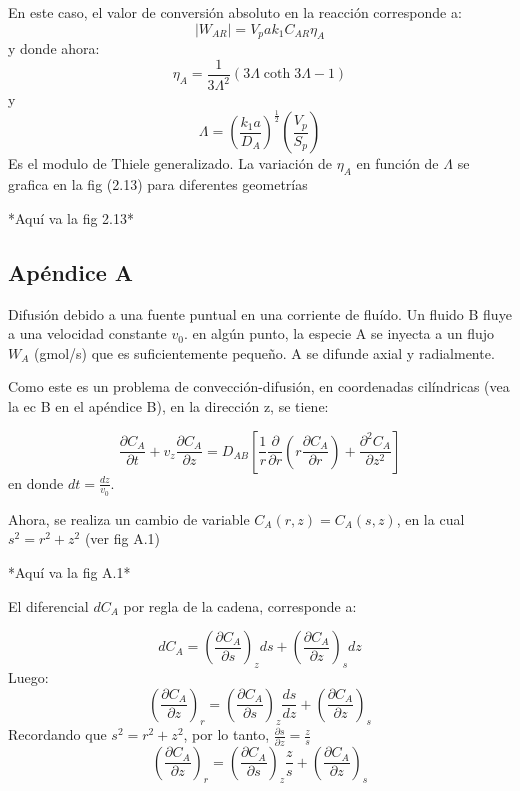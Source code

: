 En este caso, el valor de conversión absoluto en la reacción corresponde a:
\begin{equation*}
    |W_{AR}|=V_pak_1C_{AR}\eta_A
\end{equation*}
y donde ahora:
\begin{equation}
    \eta_A=\frac{1}{3\Lambda^2}(3\Lambda \coth 3\Lambda-1)
\end{equation} 
y
\begin{equation}
    \Lambda=(\frac{k_1a}{D_A})^{\frac{1}{2}}(\frac{V_p}{S_p})
\end{equation}
Es el modulo de Thiele generalizado. La variación de $\eta_A$ en función de $\Lambda$ se grafica en la fig (2.13) para diferentes geometrías

*Aquí va la fig 2.13*

\subsection{Apéndice A}
Difusión debido a una fuente puntual en una corriente de fluído.
Un fluido B fluye a una velocidad constante $v_0$. en algún punto, la especie A se inyecta a un flujo $W_A$ (gmol/s) que es suficientemente pequeño. A se difunde axial y radialmente.

Como este es un problema de convección-difusión, en coordenadas cilíndricas (vea la ec B en el apéndice B), en la dirección z, se tiene:

\begin{equation}
    \frac{\partial C_A}{\partial t}+v_z\frac{\partial C_A}{\partial z}=D_{AB}[\frac{1}{r}\frac{\partial }{\partial r}(r\frac{\partial C_A}{\partial r})+\frac{\partial ^2C_A}{\partial z^2}]
\end{equation}
en donde $dt=\frac{dz}{v_0}$.

Ahora, se realiza un cambio de variable $C_A(r,z)=C_A(s,z)$, en la cual $s^2=r^2+z^2$ (ver fig A.1)

*Aquí va la fig A.1*

El diferencial $dC_A$ por regla de la cadena, corresponde a:

\begin{equation*}
    dC_A=(\frac{\partial C_A}{\partial s})_zds+(\frac{\partial C_A}{\partial z})_sdz
\end{equation*}
Luego:
\begin{equation*}
    (\frac{\partial C_A}{\partial z})_r=(\frac{\partial C_A}{\partial s})_z\frac{ds}{dz}+(\frac{\partial C_A}{\partial z})_s
\end{equation*}
Recordando que $s^2=r^2+z^2$, por lo tanto, $\frac{\partial s}{\partial z}=\frac{z}{s}$
\begin{equation*}
    (\frac{\partial C_A}{\partial z})_r=(\frac{\partial C_A}{\partial s})_z\frac{z}{s}+(\frac{\partial C_A}{\partial z})_s
\end{equation*}

